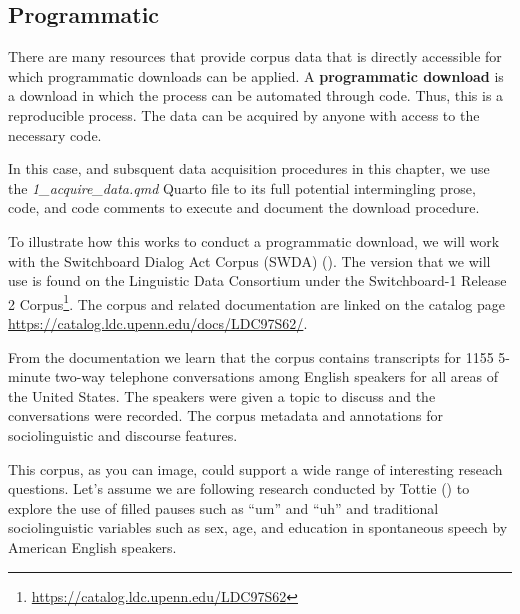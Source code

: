 \documentclass[
  letterpaper,
  krantz1]{latex/krantz-mod}
\theoremstyle{definition}
\theoremstyle{definition}
\theoremstyle{remark}
\DeclareRobustCommand{\href}[2]{#2\footnote{\url{#1}}}
\begin{document}
\subsection{Programmatic}\label{programmatic}

There are many resources that provide corpus data that is directly
accessible for which programmatic downloads can be applied. A
\textbf{programmatic download} is a download in which the process can be
automated through code. Thus, this is a reproducible process. The data
can be acquired by anyone with access to the necessary code.

In this case, and subsquent data acquisition procedures in this chapter,
we use the \emph{1\_acquire\_data.qmd} Quarto file to its full potential
intermingling prose, code, and code comments to execute and document the
download procedure.

To illustrate how this works to conduct a programmatic download, we will
work with the Switchboard Dialog Act Corpus (SWDA)
(). The
version that we will use is found on the Linguistic Data Consortium
under the \href{https://catalog.ldc.upenn.edu/LDC97S62}{Switchboard-1
Release 2 Corpus}. The corpus and related documentation are linked on
the catalog page \url{https://catalog.ldc.upenn.edu/docs/LDC97S62/}.

From the documentation we learn that the corpus contains transcripts for
1155 5-minute two-way telephone conversations among English speakers for
all areas of the United States. The speakers were given a topic to
discuss and the conversations were recorded. The corpus metadata and
annotations for sociolinguistic and discourse features.

This corpus, as you can image, could support a wide range of interesting
reseach questions. Let's assume we are following research conducted by
Tottie () to explore the use of filled
pauses such as ``um'' and ``uh'' and traditional sociolinguistic
variables such as sex, age, and education in spontaneous speech by
American English speakers.
\end{document}
